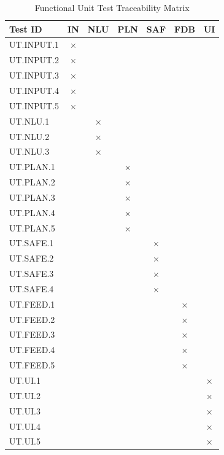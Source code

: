 \documentclass[12pt]{article}
\begin{document}
\begin{table}[htbp]
\centering
\small
\caption{Functional Unit Test Traceability Matrix}
\label{tab:unit-mod-func}
\begin{tabular}{|l|c|c|c|c|c|c|}
\hline
Test ID & IN & NLU & PLN & SAF & FDB & UI \\
\hline
UT.INPUT.1 & $\times$ & & & & & \\
\hline
UT.INPUT.2 & $\times$ & & & & & \\
\hline
UT.INPUT.3 & $\times$ & & & & & \\
\hline
UT.INPUT.4 & $\times$ & & & & & \\
\hline
UT.INPUT.5 & $\times$ & & & & & \\
\hline
UT.NLU.1 & & $\times$ & & & & \\
\hline
UT.NLU.2 & & $\times$ & & & & \\
\hline
UT.NLU.3 & & $\times$ & & & & \\
\hline
UT.PLAN.1 & & & $\times$ & & & \\
\hline
UT.PLAN.2 & & & $\times$ & & & \\
\hline
UT.PLAN.3 & & & $\times$ & & & \\
\hline
UT.PLAN.4 & & & $\times$ & & & \\
\hline
UT.PLAN.5 & & & $\times$ & & & \\
\hline
UT.SAFE.1 & & & & $\times$ & & \\
\hline
UT.SAFE.2 & & & & $\times$ & & \\
\hline
UT.SAFE.3 & & & & $\times$ & & \\
\hline
UT.SAFE.4 & & & & $\times$ & & \\
\hline
UT.FEED.1 & & & & & $\times$ & \\
\hline
UT.FEED.2 & & & & & $\times$ & \\
\hline
UT.FEED.3 & & & & & $\times$ & \\
\hline
UT.FEED.4 & & & & & $\times$ & \\
\hline
UT.FEED.5 & & & & & $\times$ & \\
\hline
UT.UI.1 & & & & & & $\times$ \\
\hline
UT.UI.2 & & & & & & $\times$ \\
\hline
UT.UI.3 & & & & & & $\times$ \\
\hline
UT.UI.4 & & & & & & $\times$ \\
\hline
UT.UI.5 & & & & & & $\times$ \\
\hline
\end{tabular}
\end{table}
\end{document}
